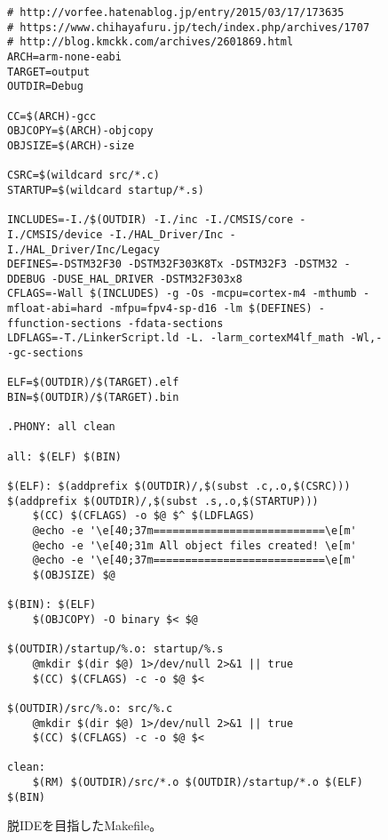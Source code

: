 \documentclass[uplatex]{jsarticle}
\begin{document}
\begin{figure}[H]
	\begin{lstlisting}[style=make]
# http://vorfee.hatenablog.jp/entry/2015/03/17/173635
# https://www.chihayafuru.jp/tech/index.php/archives/1707
# http://blog.kmckk.com/archives/2601869.html
ARCH=arm-none-eabi
TARGET=output
OUTDIR=Debug

CC=$(ARCH)-gcc
OBJCOPY=$(ARCH)-objcopy
OBJSIZE=$(ARCH)-size

CSRC=$(wildcard src/*.c)
STARTUP=$(wildcard startup/*.s)

INCLUDES=-I./$(OUTDIR) -I./inc -I./CMSIS/core -I./CMSIS/device -I./HAL_Driver/Inc -I./HAL_Driver/Inc/Legacy
DEFINES=-DSTM32F30 -DSTM32F303K8Tx -DSTM32F3 -DSTM32 -DDEBUG -DUSE_HAL_DRIVER -DSTM32F303x8
CFLAGS=-Wall $(INCLUDES) -g -Os -mcpu=cortex-m4 -mthumb -mfloat-abi=hard -mfpu=fpv4-sp-d16 -lm $(DEFINES) -ffunction-sections -fdata-sections
LDFLAGS=-T./LinkerScript.ld -L. -larm_cortexM4lf_math -Wl,--gc-sections

ELF=$(OUTDIR)/$(TARGET).elf
BIN=$(OUTDIR)/$(TARGET).bin

.PHONY: all clean

all: $(ELF) $(BIN)

$(ELF): $(addprefix $(OUTDIR)/,$(subst .c,.o,$(CSRC))) $(addprefix $(OUTDIR)/,$(subst .s,.o,$(STARTUP)))
	$(CC) $(CFLAGS) -o $@ $^ $(LDFLAGS)
	@echo -e '\e[40;37m===========================\e[m'
	@echo -e '\e[40;31m All object files created! \e[m'
	@echo -e '\e[40;37m===========================\e[m'
	$(OBJSIZE) $@

$(BIN): $(ELF)
	$(OBJCOPY) -O binary $< $@

$(OUTDIR)/startup/%.o: startup/%.s
	@mkdir $(dir $@) 1>/dev/null 2>&1 || true
	$(CC) $(CFLAGS) -c -o $@ $<

$(OUTDIR)/src/%.o: src/%.c
	@mkdir $(dir $@) 1>/dev/null 2>&1 || true
	$(CC) $(CFLAGS) -c -o $@ $<

clean:
	$(RM) $(OUTDIR)/src/*.o $(OUTDIR)/startup/*.o $(ELF) $(BIN)

	\end{lstlisting}
	\caption{脱IDEを目指したMakefile。}
\end{figure}
\newpage
\end{document}
